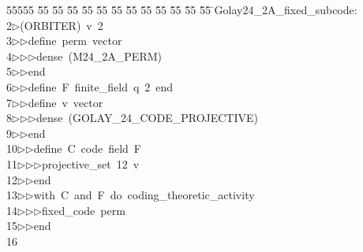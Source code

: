 %
%
\begin{tabbing}
55555 \= 55 \= 55 \= 55 \= 55 \= 55 \= 55 \= 55 \= 55 \= 55 \= 55 \= 55 \= 55 \= \>Golay24\_2A\_fixed\_subcode:\\[0pt]
2\>$\triangleright$\>(ORBITER)\ v\ 2\ \\[0pt]
3\>$\triangleright$\>$\triangleright$\>define\ perm\ vector\ \\[0pt]
4\>$\triangleright$\>$\triangleright$\>$\triangleright$\>dense\ (M24\_2A\_PERM)\ \\[0pt]
5\>$\triangleright$\>$\triangleright$\>end\ \\[0pt]
6\>$\triangleright$\>$\triangleright$\>define\ F\ finite\_field\ q\ 2\ end\ \\[0pt]
7\>$\triangleright$\>$\triangleright$\>define\ v\ vector\ \\[0pt]
8\>$\triangleright$\>$\triangleright$\>$\triangleright$\>dense\ (GOLAY\_24\_CODE\_PROJECTIVE)\ \\[0pt]
9\>$\triangleright$\>$\triangleright$\>end\ \\[0pt]
10\>$\triangleright$\>$\triangleright$\>define\ C\ code\ field\ F\ \\[0pt]
11\>$\triangleright$\>$\triangleright$\>$\triangleright$\>projective\_set\ 12\ v\ \\[0pt]
12\>$\triangleright$\>$\triangleright$\>end\ \\[0pt]
13\>$\triangleright$\>$\triangleright$\>with\ C\ and\ F\ do\ coding\_theoretic\_activity\ \\[0pt]
14\>$\triangleright$\>$\triangleright$\>$\triangleright$\>fixed\_code\ perm\ \\[0pt]
15\>$\triangleright$\>$\triangleright$\>end\ \\[0pt]
16\>\end{tabbing}
